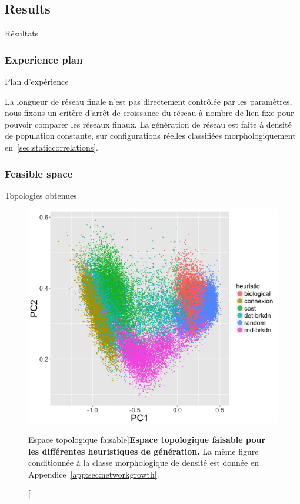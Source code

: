 \subsection{Results}{Résultats}


\subsubsection{Experience plan}{Plan d'expérience}



La longueur de réseau finale n'est pas directement contrôlée par les paramètres, nous fixons un critère d'arrêt de croissance du réseau à nombre de lien fixe pour pouvoir comparer les réseaux finaux. La génération de réseau est faite à densité de population constante, sur configurations réelles classifiées morphologiquement en~\ref{sec:staticcorrelations}. 


\subsubsection{Feasible space}{Topologies obtenues}






\begin{figure}
\includegraphics[width=\linewidth]{Figures/NetworkGrowth/feasible_space_pca}
\caption[][Espace topologique faisable]{}{\textbf{Espace topologique faisable pour les différentes heuristiques de génération.} La même figure conditionnée à la classe morphologique de densité est donnée en Appendice~\ref{app:sec:networkgrowth}.\label{fig:networkgrowth:feasiblespace}}
\end{figure}

